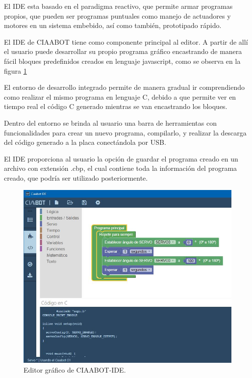 El IDE esta basado en el paradigma reactivo, que permite armar programas propios, que pueden ser programas puntuales como manejo de actuadores y motores
en un sistema embebido, así como también, prototipado rápido.

El IDE de CIAABOT tiene como componente principal al editor. A partir de allí el usuario puede desarrollar su propio programa gráfico encastrando de manera fácil bloques predefinidos creados en lenguaje javascript, como se observa en la figura \ref{fig:ciaabot-ide-bloques} 

El entorno de desarrollo integrado permite de manera gradual ir comprendiendo como realizar el mismo programa en lenguaje C, debido a que permite ver en tiempo real el código C generado mientras se van encastrando los bloques.

Dentro del entorno se brinda al usuario una barra de herramientas con funcionalidades
para crear un nuevo programa, compilarlo, y realizar la descarga del
código generado a la placa conectándola por USB.

El IDE proporciona al usuario la opción de guardar el programa creado en un
archivo con extensión .cbp, el cual contiene toda la información del programa
creado, que podría ser utilizado posteriormente. 

\begin{figure}[h]
	\centering
	\includegraphics[scale=.60]{./Figures/ciaabot-ide-bloques.PNG}
	\caption{Editor gráfico de CIAABOT-IDE.}
	\label{fig:ciaabot-ide-bloques}
\end{figure}

